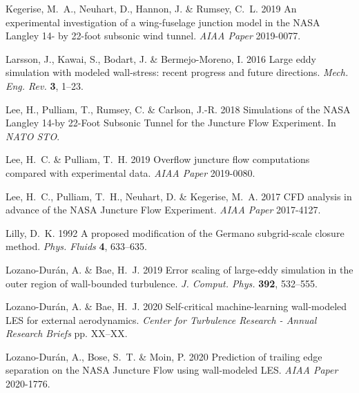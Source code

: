 \documentclass{ctr}
\begin{document}
\begin{thebibliography}{28}
{\sc Kegerise, M.~A., Neuhart, D., Hannon, J. \& Rumsey, C.~L.} 2019 An
  experimental investigation of a wing-fuselage junction model in the {NASA
  Langley} 14- by 22-foot subsonic wind tunnel. {\em AIAA Paper\/} 2019-0077.

{\sc Larsson, J., Kawai, S., Bodart, J. \& Bermejo-Moreno, I.} 2016 {Large eddy
  simulation with modeled wall-stress: recent progress and future directions}.
  {\em Mech. Eng. Rev.\/} {\bf 3}, 1--23.

{\sc Lee, H., Pulliam, T., Rumsey, C. \& Carlson, J.-R.} 2018 {Simulations of
  the {NASA Langley} 14-by 22-Foot Subsonic Tunnel for the Juncture Flow
  Experiment}. In {\em NATO STO\/}.

{\sc Lee, H.~C. \& Pulliam, T.~H.} 2019 Overflow juncture flow computations
  compared with experimental data. {\em AIAA Paper\/} 2019-0080.

{\sc Lee, H.~C., Pulliam, T.~H., Neuhart, D. \& Kegerise, M.~A.} 2017 {CFD
  analysis in advance of the NASA Juncture Flow Experiment}. {\em AIAA
  Paper\/} 2017-4127.

{\sc Lilly, D.~K.} 1992 {A proposed modification of the Germano subgrid-scale
  closure method}. {\em Phys. Fluids\/} {\bf 4}, 633--635.

{\sc Lozano-Dur{\'{a}}n, A. \& Bae, H.~J.} 2019 Error scaling of large-eddy
  simulation in the outer region of wall-bounded turbulence. {\em J. Comput.
  Phys.\/} {\bf 392}, 532--555.

{\sc Lozano-Dur\'an, A. \& Bae, H.~J.} 2020 {Self-critical machine-learning
  wall-modeled LES for external aerodynamics}. {\em Center for Turbulence
  Research - Annual Research Briefs\/} pp. XX--XX.

{\sc Lozano-Dur\'an, A., Bose, S.~T. \& Moin, P.} 2020 Prediction of trailing
  edge separation on the {NASA Juncture Flow} using wall-modeled {LES}. {\em
  AIAA Paper\/} 2020-1776.


\end{thebibliography}
\end{document}
